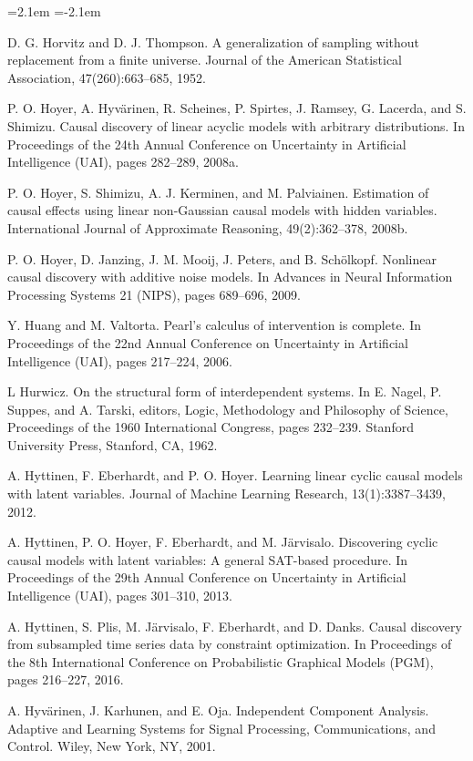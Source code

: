 \begin{list}{}{\leftmargin=2.1em
 \itemindent=-2.1em\parsep=0pt\itemsep=3pt}
\item D. G. Horvitz and D. J. Thompson. A generalization of sampling without replacement from a finite universe. Journal of the American Statistical Association, 47(260):663--685, 1952.
\item P. O. Hoyer, A. Hyvärinen, R. Scheines, P. Spirtes, J. Ramsey, G. Lacerda, and S. Shimizu. Causal discovery of linear acyclic models with arbitrary distributions. In Proceedings of the 24th Annual Conference on Uncertainty in Artificial Intelligence (UAI), pages 282--289, 2008a.
\item P. O. Hoyer, S. Shimizu, A. J. Kerminen, and M. Palviainen. Estimation of causal effects using linear non-Gaussian causal models with hidden variables. International Journal of Approximate Reasoning, 49(2):362--378, 2008b.
\item P. O. Hoyer, D. Janzing, J. M. Mooij, J. Peters, and B. Schölkopf. Nonlinear causal discovery with additive noise models. In Advances in Neural Information Processing Systems 21 (NIPS), pages 689--696, 2009.
\item Y. Huang and M. Valtorta. Pearl's calculus of intervention is complete. In Proceedings of the 22nd Annual Conference on Uncertainty in Artificial Intelligence (UAI), pages 217--224, 2006.
\item L Hurwicz. On the structural form of interdependent systems. In E. Nagel, P. Suppes, and A. Tarski, editors, Logic, Methodology and Philosophy of Science, Proceedings of the 1960 International Congress, pages 232--239. Stanford University Press, Stanford, CA, 1962.
\item A. Hyttinen, F. Eberhardt, and P. O. Hoyer. Learning linear cyclic causal models with latent variables. Journal of Machine Learning Research, 13(1):3387--3439, 2012.
\item A. Hyttinen, P. O. Hoyer, F. Eberhardt, and M. Järvisalo. Discovering cyclic causal models with latent variables: A general SAT-based procedure. In Proceedings of the 29th Annual Conference on Uncertainty in Artificial Intelligence (UAI), pages 301--310, 2013.
\item A. Hyttinen, S. Plis, M. Järvisalo, F. Eberhardt, and D. Danks. Causal discovery from subsampled time series data by constraint optimization. In Proceedings of the 8th International Conference on Probabilistic Graphical Models (PGM), pages 216--227, 2016.
\item A. Hyvärinen, J. Karhunen, and E. Oja. Independent Component Analysis. Adaptive and Learning Systems for Signal Processing, Communications, and Control. Wiley, New York, NY, 2001.

\end{list}
